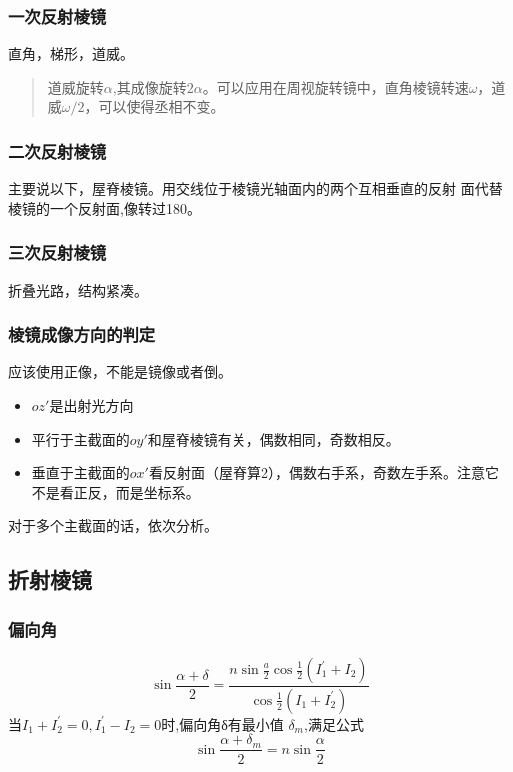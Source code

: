 \subsubsection{一次反射棱镜}直角，梯形，道威。
\begin{quote}
{\qquad{}\ccwd\kaishu{}
道威旋转$\alpha$,其成像旋转$2\alpha$。可以应用在周视旋转镜中，直角棱镜转速$\omega$，道威$\omega/2$，可以使得丞相不变。

}
\end{quote}
\subsubsection{二次反射棱镜} 主要说以下，屋脊棱镜。用交线位于棱镜光轴面内的两个互相垂直的反射
面代替棱镜的一个反射面,像转过180。
\subsubsection{三次反射棱镜}折叠光路，结构紧凑。

\subsubsection{棱镜成像方向的判定} 应该使用正像，不能是镜像或者倒。
\begin{itemize}[nosep]
\item $oz'$是出射光方向
\item 平行于主截面的$oy'$和屋脊棱镜有关，偶数相同，奇数相反。
\item 垂直于主截面的$ox'$看反射面（屋脊算2），偶数右手系，奇数左手系。注意它不是看正反，而是坐标系。
\end{itemize}

对于多个主截面的话，依次分析。
\subsection{折射棱镜}
\subsubsection{偏向角}
\begin{equation}
    \sin \frac{\alpha + \delta}{2}= \frac{n \sin \frac{a}{2}\cos \frac{1}{2}(I_{1}^{\prime}+I_{2})}{\cos \frac{1}{2}(I_{1}+I^{\prime}_{2})} \tag{4.4.1}
\end{equation}
当$ I_{1}+I_{2}^{\prime}=0,I_{1}^{\prime}-I_{2}=0 $时,偏向角δ有最小值 $  \delta _{m} $,满足公式
\begin{equation}
    \sin \frac{\alpha + \delta _{m}}{2}=n \sin \frac{\alpha}{2} \tag{4.4.2}
\end{equation}
